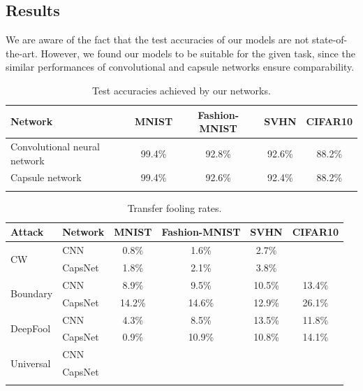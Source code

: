 \documentclass{article}
\begin{document}
\subsection{Results}

We are aware of the fact that the test accuracies of our models are not state-of-the-art. However, we found our models to be suitable for the given task, since the similar performances of convolutional and capsule networks ensure comparability.

\begin{table}[h]
	\caption{Test accuracies achieved by our networks.}
	\centering
	\begin{tabular}{lcccc}
		\toprule
		Network       & MNIST & Fashion-MNIST & SVHN & CIFAR10  \\
		\midrule
		Convolutional neural network & 99.4\% & 92.8\% & 92.6\% & 88.2\% \\
		Capsule network            & 99.4\% & 92.6\% & 92.4\% & 88.2\% \\
		\bottomrule\\
	\end{tabular}
	\label{tab:accuracies}
\end{table}

\begin{table}[h]
	\caption{Transfer fooling rates.}
	\centering
	\begin{tabular}{llcccc}
		\toprule
		Attack & Network       & MNIST & Fashion-MNIST & SVHN & CIFAR10  \\
		\midrule
		\multirow{2}{*}{CW} & CNN & 0.8\% & 1.6\% & 2.7\% &  \\
		& CapsNet            & 1.8\% & 2.1\% & 3.8\% &  \\
		\midrule
		\multirow{2}{*}{Boundary} & CNN & 8.9\% & 9.5\% & 10.5\% & 13.4\% \\
		& CapsNet            & 14.2\% & 14.6\% & 12.9\% & 26.1\% \\
		\midrule
		\multirow{2}{*}{DeepFool} & CNN & 4.3\% & 8.5\% & 13.5\% & 11.8\% \\
		& CapsNet           & 0.9\% & 10.9\% & 10.8\% & 14.1\% \\
		\midrule
		\multirow{2}{*}{Universal} & CNN &  &  &  &  \\
		& CapsNet           &  &  &  &  \\
		\bottomrule\\
	\end{tabular}
	\label{tab:attacks}
\end{table}
\end{document}
